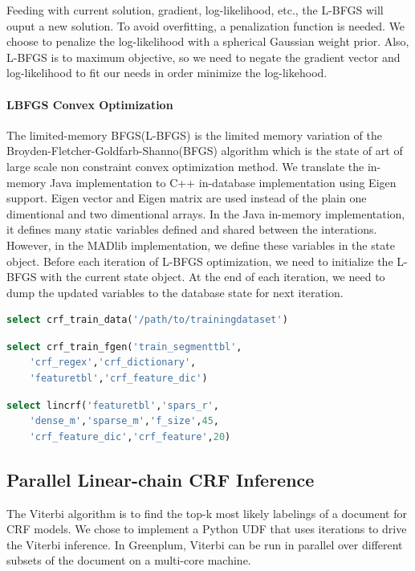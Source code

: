 \documentclass[11pt,letterpaper]{article}
\begin{document}
Feeding with current solution, gradient, log-likelihood, etc., the L-BFGS will ouput a new solution.
To avoid overfitting, a penalization function is needed. We choose to penalize the log-likelihood with a spherical Gaussian weight prior.
Also, L-BFGS is to maximum objective, so we need to negate the gradient vector and log-likelihood to fit our needs in order minimize the log-likehood.

\paragraph{LBFGS Convex Optimization}
The limited-memory BFGS(L-BFGS) is the limited memory variation of the Broyden-Fletcher-Goldfarb-Shanno(BFGS) algorithm which
is the state of art of large scale non constraint convex optimization method.
We translate the in-memory Java implementation to C++ in-database implementation using Eigen support.
Eigen vector and Eigen matrix are used instead of the plain one dimentional and two dimentional arrays.
In the Java in-memory implementation, it defines many static variables defined and shared between the interations.
However, in the MADlib implementation, we define these variables in the state object.
Before each iteration of L-BFGS optimization, we need to initialize the L-BFGS with the current state object. 
At the end of each iteration, we need to dump the updated variables to the database state for next iteration.

\begin{lstlisting}[language=SQL,gobble=4]
    select crf_train_data('/path/to/trainingdataset')
\end{lstlisting}

\begin{lstlisting}[language=SQL,gobble=4]
    select crf_train_fgen('train_segmenttbl', 
    'crf_regex','crf_dictionary', 
    'featuretbl','crf_feature_dic')
\end{lstlisting}

\begin{lstlisting}[language=SQL,gobble=4]
    select lincrf('featuretbl','spars_r',
    'dense_m','sparse_m','f_size',45, 
    'crf_feature_dic','crf_feature',20)
\end{lstlisting}

\subsection{Parallel Linear-chain CRF Inference}
 The Viterbi algorithm is to find the top-k most likely labelings of a document 
for CRF models. 
We chose to implement a Python UDF that uses iterations to drive the Viterbi inference. 
In Greenplum, Viterbi can be run in parallel over different subsets 
of the document on a multi-core machine.
\end{document}
